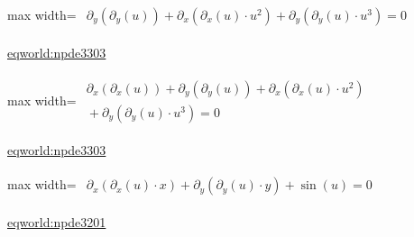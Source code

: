 \documentclass[UTF8,10pt,a4paper,fontset=mac]{ctexart}
\begin{document}
\begin{minipage}{\linewidth}\begin{center}\begin{adjustbox}{max width=\linewidth}$\displaystyle\begin{gathered}\begin{gathered}\partial_{y}(\partial_{y}(u))+\partial_{x}(\partial_{x}(u)\cdot u^{2})+\partial_{y}(\partial_{y}(u)\cdot u^{3})=0\end{gathered}\end{gathered}$\end{adjustbox}\end{center}{\small\href{https://eqworld.ipmnet.ru/en/solutions/npde/npde3303.pdf}{eqworld:npde3303}}\par\end{minipage}\par\vspace{6mm}

\begin{minipage}{\linewidth}\begin{center}\begin{adjustbox}{max width=\linewidth}$\displaystyle\begin{gathered}\begin{gathered}\partial_{x}(\partial_{x}(u))+\partial_{y}(\partial_{y}(u))+\partial_{x}(\partial_{x}(u)\cdot u^{2})\\[-1pt]{}+\partial_{y}(\partial_{y}(u)\cdot u^{3})=0\end{gathered}\end{gathered}$\end{adjustbox}\end{center}{\small\href{https://eqworld.ipmnet.ru/en/solutions/npde/npde3303.pdf}{eqworld:npde3303}}\par\end{minipage}\par\vspace{6mm}

\begin{minipage}{\linewidth}\begin{center}\begin{adjustbox}{max width=\linewidth}$\displaystyle\begin{gathered}\begin{gathered}\partial_{x}(\partial_{x}(u)\cdot x)+\partial_{y}(\partial_{y}(u)\cdot y)+\sin(u)=0\end{gathered}\end{gathered}$\end{adjustbox}\end{center}{\small\href{https://eqworld.ipmnet.ru/en/solutions/npde/npde3201.pdf}{eqworld:npde3201}}\par\end{minipage}\par\vspace{6mm}
\end{document}
